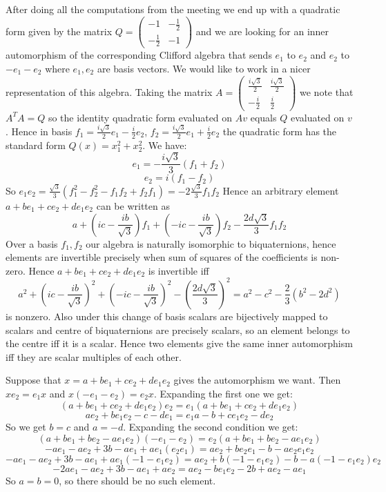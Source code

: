\documentclass[a4paper]{article}
\begin{document}
After doing all the computations from the meeting we end up with a quadratic form given by the matrix $Q=\begin{pmatrix} -1 & -\frac{1}{2}\\-\frac{1}{2} & -1 \end{pmatrix} $ and we are looking for an inner automorphism of the corresponding Clifford algebra that sends $e_1$ to $e_2$ and $e_2$ to $-e_1-e_2$ where $e_1, e_2$ are basis vectors. We would like to work in a nicer representation of this algebra. 
Taking the matrix $A=\begin{pmatrix} \frac{i\sqrt{3} }{2} & \frac{i\sqrt{3} }{2}\\-\frac{i}{2}&\frac{i}{2} \end{pmatrix} $ we note that $A^{T}A=Q$ so the identity quadratic form evaluated on $Av$ equals $Q$ evaluated on $v$. Hence in basis $f_1 = \frac{i\sqrt{3}}{2}e_1-\frac{i}{2}e_2$, $f_2 = \frac{i\sqrt{3} }{2}e_1+\frac{i}{2}e_2$ the quadratic form has the standard form $Q(x) = x_1^2 +x_2^2$. We have:
$$e_1 = -\frac{i\sqrt{3}}{3}(f_1+f_2)$$
$$e_2 = i(f_1 - f_2)$$
So $e_1e_2 = \frac{\sqrt{3}}{3}(f_1^2-f_2^2-f_1f_2+f_2f_1)= -2\frac{\sqrt{3}}{3}f_1f_2$
Hence an arbitrary element $a + b e_1 + c e_2 + d e_1e_2$ can be written as
$$a+(i c - \frac{i b}{\sqrt{3}}) f_1 +(-i c - \frac{i b}{\sqrt{3}}) f_2 - \frac{2d\sqrt{3}}{3}f_1f_2$$
Over a basis $f_1, f_2$ our algebra is naturally isomorphic to biquaternions, hence elements are invertible precisely when sum of squares of the coefficients is non-zero. Hence $a + b e_1 + c e_2 + d e_1e_2$ is invertible iff 
$$a^2+(i c - \frac{i b}{\sqrt{3}})^2 +(-i c - \frac{i b}{\sqrt{3}})^2 - (\frac{2d\sqrt{3}}{3})^2 = a^2-c^2-\frac{2}{3}(b^2-2d^2)$$ is nonzero.
Also under this change of basis scalars are bijectively mapped to scalars and centre of biquaternions are precisely scalars, so an element belongs to the centre iff it is a scalar.
Hence two elements give the same inner automorphism iff they are scalar multiples of each other.

Suppose that $x = a + b e_1 + c e_2 + d e_1 e_2$ gives the automorphism we want. Then $x e_2 = e_1 x$ and $x (-e_1 - e_2) = e_2 x$.
Expanding the first one we get:
$$(a + b e_1 + c e_2 + d e_1 e_2) e_2 = e_1 (a + b e_1 + c e_2 + d e_1 e_2)$$
$$a e_2 + b e_1 e_2 - c - d e_1 = e_1 a - b +c e_1 e_2 - d e_2$$
So we get $b=c$ and $a = -d$.
Expanding the second condition we get:	
$$(a + b e_1 + b e_2  -a e_1 e_2)(-e_1- e_2) = e_2 (a + b e_1 + b e_2 - a e_1 e_2)$$
$$-a e_1- a e_2 +3 b - a e_1 +a e_1(e_2 e_1) = a e_2 +b e_2 e_1 - b - a e_2 e_1 e_2$$
$$-a e_1- a e_2 +3 b - a e_1 +a e_1(-1-e_1 e_2) = a e_2 +b (-1-e_1 e_2) - b - a (-1-e_1e_2)e_2$$
$$-2 a e_1- a e_2 +3 b - a e_1 +a e_2 = a e_2  -b e_1 e_2 - 2 b +a e_2 - a e_1 $$
So $a=b=0$, so there should be no such element.
\end{document}
